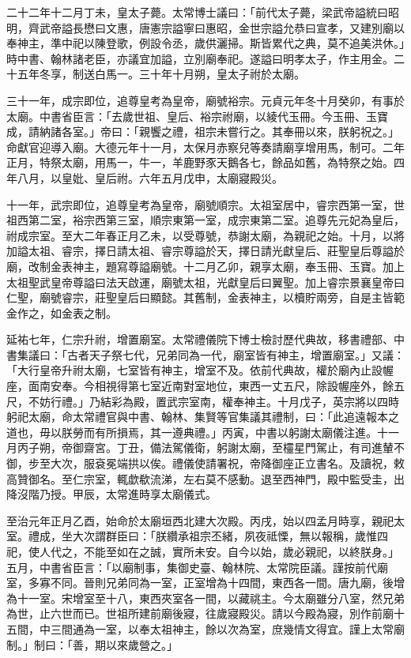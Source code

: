 \begin{pinyinscope}
 二十二年十二月丁未，皇太子薨。太常博士議曰：「前代太子薨，梁武帝謚統曰昭明，齊武帝謚長懋曰文惠，唐憲宗謚寧曰惠昭，金世宗謚允恭曰宣孝，又建別廟以奉神主，準中祀以陳登歌，例設令丞，歲供灑掃。斯皆累代之典，莫不追美洪休。」時中書、翰林諸老臣，亦議宜加謚，立別廟奉祀。遂謚曰明孝太子，作主用金。二十五年冬享，制送白馬一。三十年十月朔，皇太子祔於太廟。



 三十一年，成宗即位，追尊皇考為皇帝，廟號裕宗。元貞元年冬十月癸卯，有事於太廟。中書省臣言：「去歲世祖、皇后、裕宗祔廟，以綾代玉冊。今玉冊、玉寶成，請納諸各室。」帝曰：「親饗之禮，祖宗未嘗行之。其奉冊以來，朕躬祝之。」命獻官迎導入廟。大德元年十一月，太保月赤察兒等奏請廟享增用馬，制可。二年正月，特祭太廟，用馬一，牛一，羊鹿野豕天鵝各七，餘品如舊，為特祭之始。四年八月，以皇妣、皇后祔。六年五月戊申，太廟寢殿災。



 十一年，武宗即位，追尊皇考為皇帝，廟號順宗。太祖室居中，睿宗西第一室，世祖西第二室，裕宗西第三室，順宗東第一室，成宗東第二室。追尊先元妃為皇后，祔成宗室。至大二年春正月乙未，以受尊號，恭謝太廟，為親祀之始。十月，以將加謚太祖、睿宗，擇日請太祖、睿宗尊謚於天，擇日請光獻皇后、莊聖皇后尊謚於廟，改制金表神主，題寫尊謚廟號。十二月乙卯，親享太廟，奉玉冊、玉寶。加上太祖聖武皇帝尊謚曰法天啟運，廟號太祖，光獻皇后曰翼聖。加上睿宗景襄皇帝曰仁聖，廟號睿宗，莊聖皇后曰顯懿。其舊制，金表神主，以櫝貯兩旁，自是主皆範金作之，如金表之制。



 延祐七年，仁宗升祔，增置廟室。太常禮儀院下博士檢討歷代典故，移書禮部、中書集議曰：「古者天子祭七代，兄弟同為一代，廟室皆有神主，增置廟室。」又議：「大行皇帝升祔太廟，七室皆有神主，增室不及。依前代典故，權於廟內止設幄座，面南安奉。今相視得第七室近南對室地位，東西一丈五尺，除設幄座外，餘五尺，不妨行禮。」乃結彩為殿，置武宗室南，權奉神主。十月戊子，英宗將以四時躬祀太廟，命太常禮官與中書、翰林、集賢等官集議其禮制，曰：「此追遠報本之道也，毋以朕勞而有所損焉，其一遵典禮。」丙寅，中書以躬謝太廟儀注進。十一月丙子朔，帝御齋宮。丁丑，備法駕儀衛，躬謝太廟，至欞星門駕止，有司進輦不御，步至大次，服袞冕端拱以俟。禮儀使請署祝，帝降御座正立書名。及讀祝，敕高贊御名。至仁宗室，輒歔欷流涕，左右莫不感動。退至西神門，殿中監受圭，出降沒階乃授。甲辰，太常進時享太廟儀式。



 至治元年正月乙酉，始命於太廟垣西北建大次殿。丙戌，始以四孟月時享，親祀太室。禮成，坐大次謂群臣曰：「朕纘承祖宗丕緒，夙夜祗慄，無以報稱，歲惟四祀，使人代之，不能至如在之誠，實所未安。自今以始，歲必親祀，以終朕身。」五月，中書省臣言：「以廟制事，集御史臺、翰林院、太常院臣議。謹按前代廟室，多寡不同。晉則兄弟同為一室，正室增為十四間，東西各一間。唐九廟，後增為十一室。宋增室至十八，東西夾室各一間，以藏祧主。今太廟雖分八室，然兄弟為世，止六世而已。世祖所建前廟後寢，往歲寢殿災。請以今殿為寢，別作前廟十五間，中三間通為一室，以奉太祖神主，餘以次為室，庶幾情文得宜。謹上太常廟制。」制曰：「善，期以來歲營之。」




\end{pinyinscope}
